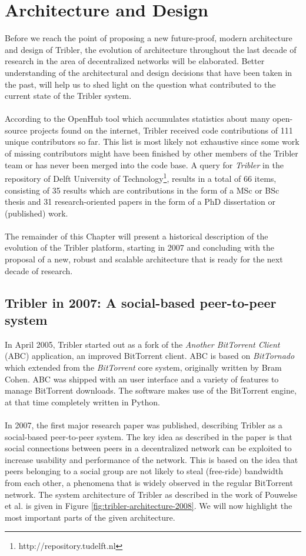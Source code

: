 \chapter{Architecture and Design}
\label{chapter:architecture}

Before we reach the point of proposing a new future-proof, modern architecture and design of Tribler, the evolution of architecture throughout the last decade of research in the area of decentralized networks will be elaborated. Better understanding of the architectural and design decisions that have been taken in the past, will help us to shed light on the question what contributed to the current state of the Tribler system.\\\\
According to the OpenHub tool which accumulates statistics about many open-source projects found on the internet, Tribler received code contributions of 111 unique contributors so far\cite{openhubtribler}. This list is most likely not exhaustive since some work of missing contributors might have been finished by other members of the Tribler team or has never been merged into the code base. A query for \emph{Tribler} in the repository of Delft University of Technology\footnote{http://repository.tudelft.nl}, results in a total of 66 items, consisting of 35 results which are contributions in the form of a MSc or BSc thesis and 31 research-oriented papers in the form of a PhD dissertation or (published) work.\\\\
The remainder of this Chapter will present a historical description of the evolution of the Tribler platform, starting in 2007 and concluding with the proposal of a new, robust and scalable architecture that is ready for the next decade of research.

\section{Tribler in 2007: A social-based peer-to-peer system}
In April 2005, Tribler started out as a fork of the \emph{Another BitTorrent Client} (ABC) application, an improved BitTorrent client. ABC is based on \emph{BitTornado} which extended from the \emph{BitTorrent} core system, originally written by Bram Cohen. ABC was shipped with an user interface and a variety of features to manage BitTorrent downloads. The software makes use of the BitTorrent engine, at that time completely written in Python.\\\\
In 2007, the first major research paper was published, describing Tribler as a social-based peer-to-peer system\cite{pouwelse2008tribler}. The key idea as described in the paper is that social connections between peers in a decentralized network can be exploited to increase usability and performance of the network. This is based on the idea that peers belonging to a social group are not likely to steal (free-ride) bandwidth from each other, a phenomena that is widely observed in the regular BitTorrent network. The system architecture of Tribler as described in the work of Pouwelse et al. is given in Figure \ref{fig:tribler-architecture-2008}. We will now highlight the most important parts of the given architecture.


